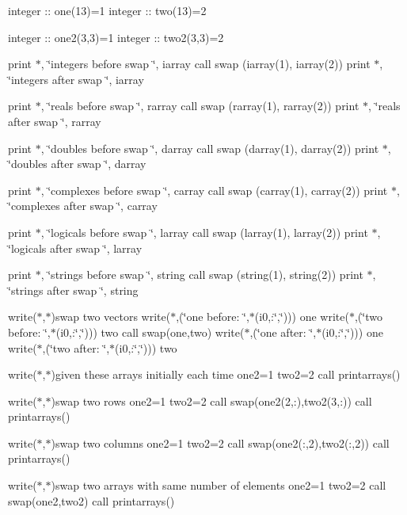 integer \+:\+: one(13)=1 integer \+:\+: two(13)=2

integer \+:\+: one2(3,3)=1 integer \+:\+: two2(3,3)=2

print $\ast$, \char`\"{}integers before swap \char`\"{}, iarray call swap (iarray(1), iarray(2)) print $\ast$, \char`\"{}integers after swap  \char`\"{}, iarray

print $\ast$, \char`\"{}reals before swap \char`\"{}, rarray call swap (rarray(1), rarray(2)) print $\ast$, \char`\"{}reals after swap  \char`\"{}, rarray

print $\ast$, \char`\"{}doubles before swap \char`\"{}, darray call swap (darray(1), darray(2)) print $\ast$, \char`\"{}doubles after swap  \char`\"{}, darray

print $\ast$, \char`\"{}complexes before swap \char`\"{}, carray call swap (carray(1), carray(2)) print $\ast$, \char`\"{}complexes after swap  \char`\"{}, carray

print $\ast$, \char`\"{}logicals before swap \char`\"{}, larray call swap (larray(1), larray(2)) print $\ast$, \char`\"{}logicals after swap  \char`\"{}, larray

print $\ast$, \char`\"{}strings before swap \char`\"{}, string call swap (string(1), string(2)) print $\ast$, \char`\"{}strings after swap \char`\"{}, string

write($\ast$,$\ast$)\textquotesingle{}swap two vectors\textquotesingle{} write($\ast$,\textquotesingle{}(\char`\"{}one before\+: \char`\"{},$\ast$(i0,\+:\char`\"{},\char`\"{}))\textquotesingle{}) one write($\ast$,\textquotesingle{}(\char`\"{}two before\+: \char`\"{},$\ast$(i0,\+:\char`\"{},\char`\"{}))\textquotesingle{}) two call swap(one,two) write($\ast$,\textquotesingle{}(\char`\"{}one after\+: \char`\"{},$\ast$(i0,\+:\char`\"{},\char`\"{}))\textquotesingle{}) one write($\ast$,\textquotesingle{}(\char`\"{}two after\+: \char`\"{},$\ast$(i0,\+:\char`\"{},\char`\"{}))\textquotesingle{}) two

write($\ast$,$\ast$)\textquotesingle{}given these arrays initially each time \textquotesingle{} one2=1 two2=2 call printarrays()

write($\ast$,$\ast$)\textquotesingle{}swap two rows\textquotesingle{} one2=1 two2=2 call swap(one2(2,\+:),two2(3,\+:)) call printarrays()

write($\ast$,$\ast$)\textquotesingle{}swap two columns\textquotesingle{} one2=1 two2=2 call swap(one2(\+:,2),two2(\+:,2)) call printarrays()

write($\ast$,$\ast$)\textquotesingle{}swap two arrays with same number of elements\textquotesingle{} one2=1 two2=2 call swap(one2,two2) call printarrays()

